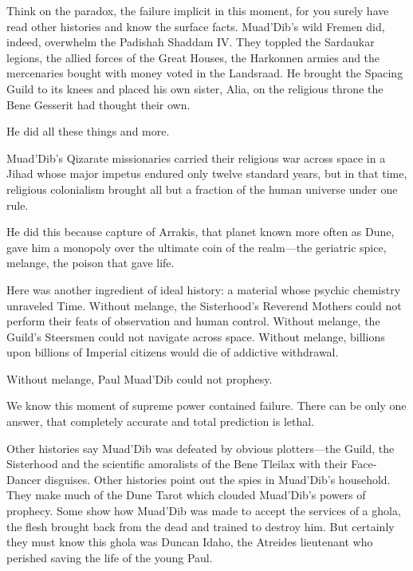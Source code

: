 \documentclass[a4paper, 12pt, oldfontcommands, final]{memoir}
\begin{document}
Think on the paradox, the failure implicit in this moment, for you surely have read other histories and know the surface facts. Muad'Dib's wild Fremen did, indeed, overwhelm the Padishah Shaddam IV. They toppled the Sardaukar legions, the allied forces of the Great Houses, the Harkonnen armies and the mercenaries bought with money voted in the Landsraad. He brought the Spacing Guild to its knees and placed his own sister, Alia, on the religious throne the Bene Gesserit had thought their own.

He did all these things and more.

Muad'Dib's Qizarate missionaries carried their religious war across space in a Jihad whose major impetus endured only twelve standard years, but in that time, religious colonialism brought all but a fraction of the human universe under one rule.

He did this because capture of Arrakis, that planet known more often as Dune, gave him a monopoly over the ultimate coin of the realm---the geriatric spice, melange, the poison that gave life.

Here was another ingredient of ideal history: a material whose psychic chemistry unraveled Time. Without melange, the Sisterhood's Reverend Mothers could not perform their feats of observation and human control. Without melange, the Guild’s Steersmen could not navigate across space. Without melange, billions upon billions of Imperial citizens would die of addictive withdrawal.

Without melange, Paul Muad'Dib could not prophesy.

We know this moment of supreme power contained failure. There can be only one answer, that completely accurate and total prediction is lethal.

Other histories say Muad'Dib was defeated by obvious plotters---the Guild, the Sisterhood and the scientific amoralists of the Bene Tleilax with their Face-Dancer disguises. Other histories point out the spies in Muad'Dib's household. They make much of the Dune Tarot which clouded Muad'Dib's powers of prophecy. Some show how Muad'Dib was made to accept the services of a ghola, the flesh brought back from the dead and trained to destroy him. But certainly they must know this ghola was Duncan Idaho, the Atreides lieutenant who perished saving the life of the young Paul.
\end{document}
